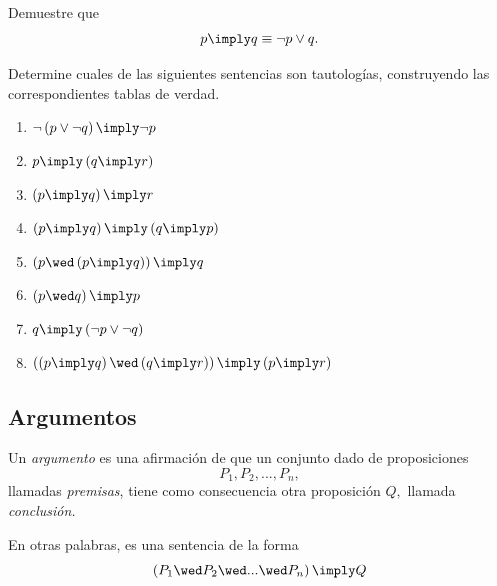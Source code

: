  \begin{resuelto}
  Demuestre que $$p\imply q \equiv \neg p \vee q.$$
 \end{resuelto}




 \begin{resuelto} Determine cuales de las siguientes sentencias son tautologías, construyendo las correspondientes tablas de verdad.
  \begin{enumerate}
   \item $\neg\left( p \vee \neg q \right) \imply \neg p$
   \item $p \imply \left( q\imply r \right)$
   \item $\left( p \imply q \right)\imply r$
   \item $\left( p\imply q \right) \imply \left( q\imply p \right)$
   \item $\left( p \wed \left( p \imply q \right) \right) \imply q$
   \item $\left( p \wed q \right) \imply p$
   \item $q \imply \left( \neg p \vee \neg q \right)$
   \item $\left( \left( p\imply q \right) \wed \left( q \imply r \right) \right) \imply \left( p \imply r \right)$
  \end{enumerate}

 \end{resuelto}



\subsection{Argumentos}


 Un \emph{argumento} es una afirmación de que un conjunto dado de proposiciones $$P_{1}, P_{2},...,P_{n},$$ llamadas \emph{premisas}, tiene como consecuencia otra proposición $Q,$ llamada \emph{conclusión.}

 En otras palabras, es una sentencia de la forma
 $$
  \left( P_{1} \wed P_{2} \wed...\wed P_{n}\right) \imply Q
  $$

